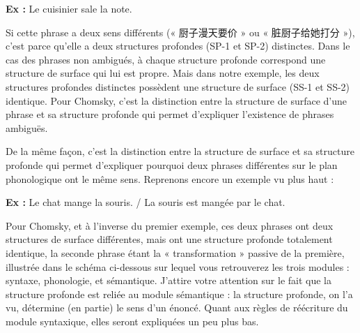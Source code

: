 \noindent\textbf{Ex :} Le cuisinier sale la note.\par

Si cette phrase a deux sens différents (« 厨子漫天要价 » ou « 脏厨子给她打分 »), c’est parce qu’elle a deux structures profondes (SP-1 et SP-2) distinctes. Dans le cas des phrases non ambigués, à chaque structure profonde correspond une structure de surface qui lui est propre. Mais dans notre exemple, les deux structures profondes distinctes possèdent une structure de surface (SS-1 et SS-2) identique. Pour Chomsky, c’est la distinction entre la structure de surface d’une phrase et sa structure profonde qui permet d’expliquer l’existence de phrases ambiguës.\par

De la même façon, c’est la distinction entre la structure de surface et sa structure profonde qui permet d’expliquer pourquoi deux phrases différentes sur le plan phonologique ont le même sens. Reprenons encore un exemple vu plus haut :\par

\noindent\textbf{Ex :} Le chat mange la souris. / La souris est mangée par le chat.\par

Pour Chomsky, et à l’inverse du premier exemple, ces deux phrases ont deux structures de surface différentes, mais ont une structure profonde totalement identique, la seconde phrase étant la « transformation » passive de la première, illustrée dans le schéma ci-dessous sur lequel vous retrouverez les trois modules : syntaxe, phonologie, et sémantique. J’attire votre attention sur le fait que la structure profonde est reliée au module sémantique : la structure profonde, on l’a vu, détermine (en partie) le sens d’un énoncé. Quant aux règles de réécriture du module syntaxique, elles seront expliquées un peu plus bas.\par


